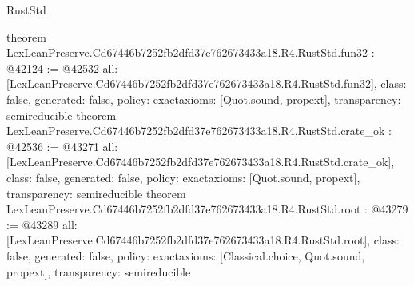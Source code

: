 \begin{lexlean}{RustStd}
\begin{coremodule}
{}
theorem LexLeanPreserve.Cd67446b7252fb2dfd37e762673433a18.R4.RustStd.fun32 : @42124 := @42532 {
  all: [LexLeanPreserve.Cd67446b7252fb2dfd37e762673433a18.R4.RustStd.fun32],
  class: false,
  generated: false,
  policy: exact{axioms: [Quot.sound, propext]},
  transparency: semireducible
}
theorem LexLeanPreserve.Cd67446b7252fb2dfd37e762673433a18.R4.RustStd.crate_ok : @42536 := @43271 {
  all: [LexLeanPreserve.Cd67446b7252fb2dfd37e762673433a18.R4.RustStd.crate_ok],
  class: false,
  generated: false,
  policy: exact{axioms: [Quot.sound, propext]},
  transparency: semireducible
}
theorem LexLeanPreserve.Cd67446b7252fb2dfd37e762673433a18.R4.RustStd.root : @43279 := @43289 {
  all: [LexLeanPreserve.Cd67446b7252fb2dfd37e762673433a18.R4.RustStd.root],
  class: false,
  generated: false,
  policy: exact{axioms: [Classical.choice, Quot.sound, propext]},
  transparency: semireducible
}


\end{coremodule}
\end{lexlean}
